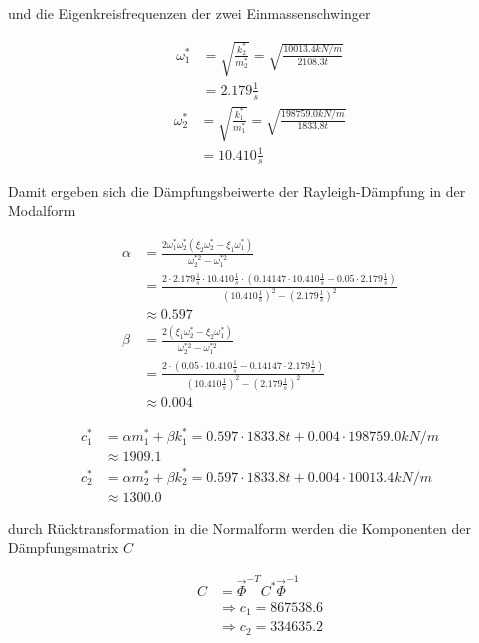 und die Eigenkreisfrequenzen der zwei Einmassenschwinger

\begin{align*}
\omega_1^* &= \sqrt{\frac{k_2^*}{m_2^*}} = \sqrt{\frac{10013.4 kN/m}{2108.3 t}}\\
           &= 2.179 \frac{1}{s}
\end{align*}
\begin{align*}
\omega_2^* &= \sqrt{\frac{k_1^*}{m_1^*}} = \sqrt{\frac{198759.0 kN/m}{1833.8 t}}\\
           &= 10.410 \frac{1}{s}
\end{align*}

\pagebreak

Damit ergeben sich die Dämpfungsbeiwerte der Rayleigh-Dämpfung in der Modalform

\begin{align*}
\alpha &= \frac{2 \omega_1^* \omega_2^* (\xi_2 \omega_2^* - \xi_1 \omega_1^*)}{\omega_2^{*2} - \omega_1^{*2}}\\
       &= \frac{2 \cdot 2.179 \frac{1}{s} \cdot 10.410 \frac{1}{s} \cdot (0.14147 \cdot 10.410 \frac{1}{s} - 0.05 \cdot 2.179 \frac{1}{s})}{(10.410 \frac{1}{s})^2 - (2.179 \frac{1}{s})^2}\\
       &\approx 0.597\\[2em]
\beta  &= \frac{2 (\xi_1 \omega_2^* - \xi_2 \omega_1^*)}{\omega_2^{*2} - \omega_1^{*2}}\\
       &= \frac{2 \cdot (0.05 \cdot 10.410 \frac{1}{s} - 0.14147 \cdot 2.179 \frac{1}{s})}{(10.410 \frac{1}{s})^2 - (2.179 \frac{1}{s})^2}\\
       &\approx 0.004
\end{align*}

\begin{align*}
c_1^* &= \alpha m_1^* + \beta k_1^* = 0.597 \cdot 1833.8 t + 0.004 \cdot 198759.0 kN/m\\
      &\approx 1909.1\\
c_2^* &= \alpha m_2^* + \beta k_2^* = 0.597 \cdot 1833.8 t + 0.004 \cdot 10013.4 kN/m\\
      &\approx 1300.0
\end{align*}

durch Rücktransformation in die Normalform werden die Komponenten der Dämpfungsmatrix $C$

\begin{align*}
C &= \vec{\Phi}^{-T} C^* \vec{\Phi}^{-1}\\
  &\Rightarrow c_1 = 867538.6\\
  &\Rightarrow c_2 = 334635.2
\end{align*}

